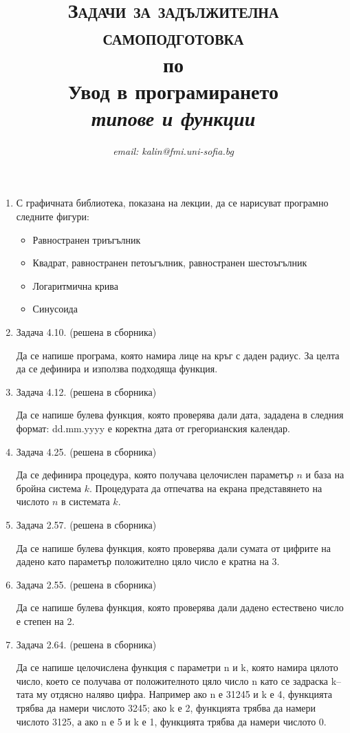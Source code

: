 \documentclass[12pt,a4paper]{article}
\author{\textit{email: kalin@fmi.uni-sofia.bg}}
\title{\textsc{Задачи за задължителна самоподготовка} \\
по \\
Увод в програмирането\\
\textit{типове и функции}}
\begin{document}
\maketitle


\begin{enumerate}

	\item С графичната библиотека, показана на лекции, да се нарисуват програмно следните фигури:

	\begin{itemize}
		\item Равностранен триъгълник
		\item Квадрат, равностранен петоъгълник, равностранен шестоъгълник
		\item Логаритмична крива
		\item Синусоида
	\end{itemize}

	\item Задача 4.10. (решена в сборника)

	Да се напише програма, която намира лице на кръг с даден радиус. За целта да се дефинира и използва подходяща функция.

	\item Задача 4.12. (решена в сборника)

	Да се напише булева функция, която проверява дали дата, зададена в следния формат: dd.mm.yyyy е коректна дата от грегорианския календар. 

	\item Задача 4.25. (решена в сборника)

	Да се дефинира процедура, която получава целочислен параметър $n$ и база на бройна система $k$. Процедурата да отпечатва на екрана представянето на числото $n$ в системата $k$.

\item Задача 2.57. (решена в сборника)

Да се напише булева функция, която проверява дали сумата от цифрите на дадено като параметър положително цяло число е кратна на 3.

\item Задача 2.55. (решена в сборника)

Да се напише булева функция, която проверява дали дадено естествено число е степен на 2.

\item Задача 2.64. (решена в сборника)

Да се напише целочислена функция с параметри n и k, която намира цялото число, което се получава от положителното цяло число n като се задраска k–тата му отдясно наляво цифра. Например ако n е 31245 и k е 4, функцията трябва да намери числото 3245; ако k е 2, функцията трябва да намери числото 3125, а ако n е 5 и k е 1, функцията трябва да намери числото 0.


\end{enumerate}
\end{document}
